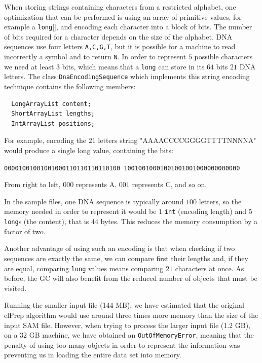 \documentclass[a4paper,twoside]{article}
\begin{document}
When storing strings containing characters from a restricted alphabet, one optimization that can be performed is using an array of primitive values, for example a {\texttt{long}[]}, and encoding each character into a block of bits.
The number of bits required for a character depends on the size of the alphabet.
DNA sequences use four letters {\texttt{A,C,G,T}}, but it is possible for a machine to read incorrectly a symbol and to return {\texttt{N}}.
In order to represent $5$ possible characters we need at least $3$ bits,
which means that a {\texttt{long}} can store in its $64$ bits $21$ DNA letters.
The class {\texttt{DnaEncodingSequence}} which implements this string encoding technique contains the following members:
\begin{verbatim}
  LongArrayList content;
  ShortArrayList lengths;      
  IntArrayList positions;     
\end{verbatim}
For example, encoding the $21$ letters string "AAAACCCCGGGGTTTTNNNNA" would produce a single long value, containing the bits:\\
{\texttt{00001001001001000110110110110100
10010010001001001001000000000000}

}

From right to left, $000$ represents A, $001$ represents C, and so on.

In the sample files, one DNA sequence is typically around $100$ letters, so the memory needed in order to represent it would be $1$ {\texttt{int}} (encoding length) and $5$ {\texttt{long}}s (the content), that is $44$ bytes.
This reduces the memory consumption by a factor of two.

Another advantage of using such an encoding is that when checking if two sequences are exactly the same, we can compare first their lengths and, if they are equal, comparing {\texttt{long}} values means comparing $21$ characters at once.
As before, the GC will also benefit from the reduced number of objects that must be visited.


Running the smaller input file (144 MB), we have estimated that the original elPrep algorithm would use around three times more memory than the size of the input SAM file.
However, when trying to process the larger input file (1.2 GB), on a 32 GB machine, we have obtained an {\texttt{OutOfMemoryError}}, meaning that the penalty of using too many objects in order to represent the information was preventing us in loading the entire data set into memory.
\end{document}
